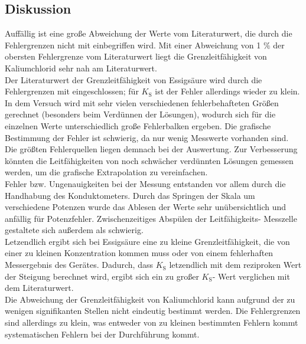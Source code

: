 \documentclass[12pt,a4paper,titlepage,headinclude,bibtotoc]{scrartcl}
\begin{document}


\subsection{Diskussion}

Auffällig ist eine große Abweichung der Werte vom Literaturwert, die durch die Fehlergrenzen nicht mit einbegriffen wird. Mit einer Abweichung von 1 $\%$ der obersten Fehlergrenze vom Literaturwert liegt die Grenzleitfähigkeit von Kaliumchlorid sehr nah am Literaturwert. \\
Der Literaturwert der Grenzleitfähigkeit von Essigsäure wird durch die Fehlergrenzen mit eingeschlossen; für $K_\mathrm{S}$ ist der Fehler allerdings wieder zu klein.\\

In dem Versuch wird mit sehr vielen verschiedenen fehlerbehafteten Größen gerechnet (besonders beim Verdünnen der Lösungen), wodurch sich für die einzelnen Werte unterschiedlich große Fehlerbalken ergeben. Die grafische Bestimmung der Fehler ist schwierig, da nur wenig Messwerte vorhanden sind. \\

Die größten Fehlerquellen liegen demnach bei der Auswertung. Zur Verbesserung könnten die Leitfähigkeiten von noch schwächer verdünnten Lösungen gemessen werden, um die grafische Extrapolation zu vereinfachen.  \\

Fehler bzw. Ungenauigkeiten bei der Messung entstanden vor allem durch die Handhabung des Konduktometers. Durch das Springen der Skala um verschiedene Potenzen wurde das Ablesen der Werte sehr unübersichtlich und anfällig für Potenzfehler. Zwischenzeitiges Abspülen der Leitfähigkeits- Messzelle gestaltete sich außerdem als schwierig. \\

Letzendlich ergibt sich bei Essigsäure eine zu kleine Grenzleitfähigkeit, die von einer zu kleinen Konzentration kommen muss oder von einem fehlerhaften Messergebnis des Gerätes. Dadurch, dass $K_\mathrm{S}$ letzendlich mit dem reziproken Wert der Steigung berechnet wird, ergibt sich ein zu großer $K_\mathrm{S}$- Wert verglichen mit dem Literaturwert. \\
Die Abweichung der Grenzleitfähigkeit von Kaliumchlorid kann aufgrund der zu wenigen signifikanten Stellen nicht eindeutig bestimmt werden. Die Fehlergrenzen sind allerdings zu klein, was entweder von zu kleinen bestimmten Fehlern kommt systematischen Fehlern bei der Durchführung kommt. \\
\end{document}

